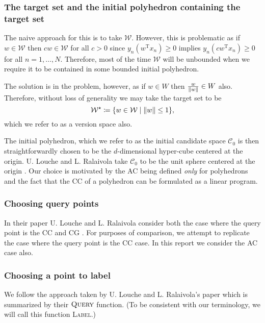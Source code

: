 \documentclass[11pt]{amsart}
\theoremstyle{definition}
\theoremstyle{remark}
\newcommand{\transpose}{\text{T}}
\begin{document}
            \subsubsection*{The target set and the initial polyhedron containing the target set} The naive approach for this is to take $\mathcal{W}$. However, this is problematic as if $w \in \mathcal{W}$ then $cw \in \mathcal{W}$ for all $c>0$ since $y_n (w^\transpose x_n) \geq 0$ implies $y_n (cw^\transpose x_n) \geq 0$ for all $n = 1, \dots, N$. Therefore, most of the time $\mathcal{W}$ will be unbounded when we require it to be contained in some bounded initial polyhedron. 

            The solution is in the problem, however, as if $w \in W$ then $\frac{w}{\norm{w}} \in W$ also. Therefore, without loss of generality we may take the target set to be
            \begin{equation*}
                \mathcal{W}^\star \coloneqq \{w \in \mathcal{W} \;|\; \norm{w} \leq 1\},
            \end{equation*}
            which we refer to as a version space also.

            The initial polyhedron, which we refer to as the initial candidate space $\mathcal{C}_0$ is then straightforwardly chosen to be the $d$-dimensional hyper-cube centered at the origin. U. Louche and L. Ralaivola take $\mathcal{C}_0$ to be the unit sphere centered at the origin \cite[Section II.B]{LR15}. Our choice is motivated by the AC being defined \emph{only} for polyhedrons and the fact that the CC of a polyhedron can be formulated as a linear program.

            \subsubsection*{Choosing query points} In their paper U. Louche and L. Ralaivola consider both the case where the query point is the CC and  CG \cite[Section III.D]{LR15}. For purposes of comparison, we attempt to replicate the case where the query point is the CC case. In this report we consider the AC case also.

            \subsubsection*{Choosing a point to label }We follow the approach taken by U. Louche and L. Ralaivola's paper \cite[Section III.D]{LR15} which is summarized by their $\textsc{Query}$ function. (To be consistent with our terminology, we will call this function \textsc{Label}.)
\end{document}
